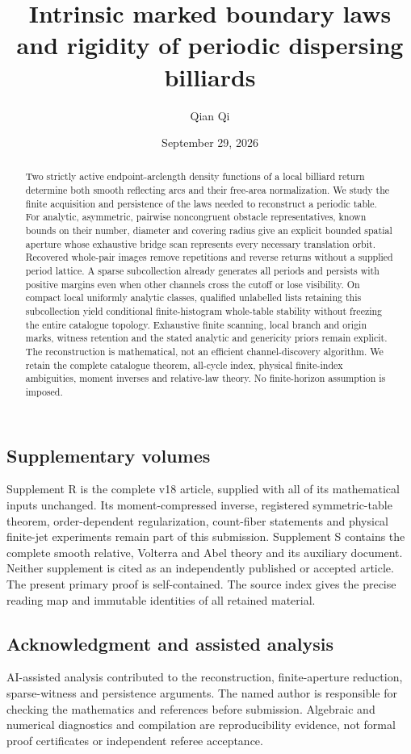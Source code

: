 \documentclass[11pt]{amsart}
\title[Intrinsic marked boundary laws]{Intrinsic marked boundary laws and rigidity of periodic dispersing billiards}
\author{Qian Qi}
\date{September 29, 2026}
\theoremstyle{definition}\newtheorem{definition}[theorem]{Definition}
\theoremstyle{remark}\newtheorem{remark}[theorem]{Remark}
\numberwithin{equation}{section}
\begin{document}
\begin{abstract}
Two strictly active endpoint-arclength density functions of a local
billiard return determine both smooth reflecting arcs and their
free-area normalization. We study the finite acquisition and persistence
of the laws needed to reconstruct a periodic table. For analytic,
asymmetric, pairwise noncongruent obstacle representatives, known bounds
on their number, diameter and covering radius give an explicit bounded
spatial aperture whose exhaustive bridge scan represents every necessary
translation orbit. Recovered whole-pair images remove repetitions and
reverse returns without a supplied period lattice. A sparse subcollection
already generates all periods and persists with positive margins even
when other channels cross the cutoff or lose visibility. On compact local
uniformly analytic classes, qualified unlabelled lists retaining this
subcollection yield conditional finite-histogram whole-table stability
without freezing the entire catalogue topology. Exhaustive finite scanning,
local branch and origin marks, witness retention and the stated analytic
and genericity priors remain explicit. The reconstruction is mathematical,
not an efficient channel-discovery algorithm. We retain the complete
catalogue theorem, all-cycle index, physical finite-index ambiguities,
moment inverses and relative-law theory. No finite-horizon assumption is
imposed.
\end{abstract}
\maketitle








\subsection*{Supplementary volumes}
Supplement R is the complete v18 article, supplied with
all of its mathematical inputs unchanged. Its moment-compressed inverse,
registered symmetric-table theorem, order-dependent regularization,
count-fiber statements and physical finite-jet experiments remain part
of this submission. Supplement S contains the complete smooth relative,
Volterra and Abel theory and its auxiliary document. Neither supplement
is cited as an independently published or accepted article. The present
primary proof is self-contained. The source index gives the precise
reading map and immutable identities of all retained material.
\subsection*{Acknowledgment and assisted analysis}
AI-assisted analysis contributed to the reconstruction, finite-aperture
reduction, sparse-witness and persistence arguments. The named author is responsible for
checking the mathematics and references before submission. Algebraic
and numerical diagnostics and compilation are reproducibility evidence,
not formal proof certificates or independent referee acceptance.

\end{document}
